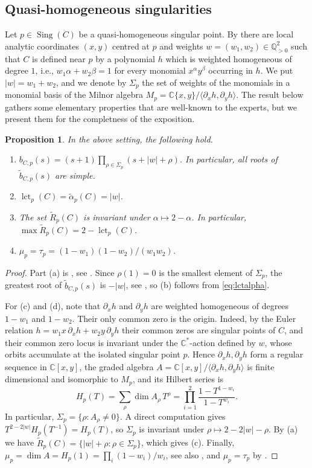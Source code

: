 \documentclass[11pt]{amsart}
\newtheorem{proposition}[theorem]{Proposition}
\theoremstyle{definition}
\numberwithin{equation}{section}
\newcommand{\CC}{\mathbb{C}}
\newcommand{\QQ}{\mathbb{Q}}
\newcommand{\tb}{\widetilde{b}}
\newcommand{\tR}{\widetilde{R}}
\newcommand{\talpha}{\widetilde{\alpha}}
\newcommand{\gadd}[1]{#1}
\DeclareMathOperator{\Sing}{Sing}
\DeclareMathOperator{\lct}{lct}
\begin{document}
\subsection*{Quasi-homogeneous singularities}
Let $p\in\Sing(C)$ be a quasi-homogeneous singular point.
By \cite{Sa71} there are local analytic coordinates $(x,y)$ centred at $p$ and weights $w=(w_1,w_2)\in\QQ^2_{>0}$ such that $C$ is defined near $p$ by a polynomial $h$ which is weighted homogeneous of degree $1$, i.e., $w_1\alpha+w_2\beta=1$ for every monomial $x^\alpha y^\beta$ occurring in $h$.
We put $|w|=w_1+w_2$, and we denote by $\Sigma_p$ the set of weights of the monomials in a monomial basis of the Milnor algebra $M_p=\CC\{x,y\}/\langle\partial_xh,\partial_yh\rangle$.
The result below gathers some elementary properties that are well-known to the experts, but we present them for the completness of the exposition.
\begin{proposition}\label{prop:qhBS}
In the above setting, the following hold.
\begin{enumerate}[label=\textup{(\alph*)},leftmargin=*]
\item $b_{C,p}(s)=(s+1)\prod_{\rho\in\Sigma_p}(s+|w|+\rho)$. In particular, all roots of $\tb_{C,p}(s)$ are simple.
\item $\lct_p(C)=\talpha_p(C)=|w|$.
\item The set $\tR_p(C)$ is invariant under $\alpha\mapsto2-\alpha$. In particular, $\max\tR_p(C)=2-\lct_p(C)$.
\item $\mu_p=\tau_p=(1-w_1)(1-w_2)/(w_1w_2)$.
\end{enumerate}
\end{proposition}

\begin{proof}
Part (a) is \cite{BGM}, see \cite[Theorem~2.4]{PoBS}.
Since $\rho(1)=0$ is the smallest element of $\Sigma_p$, the greatest root of $\tb_{C,p}(s)$ is $-|w|$, see \cite[Example~9.4]{PoBS}, so (b) follows from \eqref{eq:lctalpha}.

For (c) and (d), note that $\partial_xh$ and $\partial_yh$ are weighted homogeneous of degrees $1-w_1$ and $1-w_2$.
Their only common zero is the origin.
Indeed, by the Euler relation $h=w_1x\,\partial_xh+w_2y\,\partial_yh$ their common zeros are singular points of $C$, and their common zero locus is invariant under the $\CC^*$-action defined by $w$, whose orbits accumulate at the isolated singular point $p$.
Hence $\partial_xh,\partial_yh$ form a regular sequence in $\CC[x,y]$, the graded algebra $A=\CC[x,y]/\langle\partial_xh,\partial_yh\rangle$ is finite dimensional and isomorphic to $M_p$, and its Hilbert series is
\[
H_p(T)=\sum_\rho\dim A_\rho\,T^\rho=\prod_{i=1}^2\frac{1-T^{1-w_i}}{1-T^{w_i}} .
\]
In particular, $\Sigma_p=\{\rho\colon A_\rho\neq0\}$.
A direct computation gives $T^{2-2|w|}H_p(T^{-1})=H_p(T)$, so $\Sigma_p$ is invariant under $\rho\mapsto2-2|w|-\rho$.
By (a) we have $\tR_p(C)=\{|w|+\rho\colon\rho\in\Sigma_p\}$, which gives (c).
Finally, $\mu_p=\dim A=H_p(1)=\prod_i(1-w_i)/w_i$\gadd{, see also \cite{MO}}, and $\mu_p=\tau_p$ by \cite{Sa71}.
\end{proof}
\end{document}

